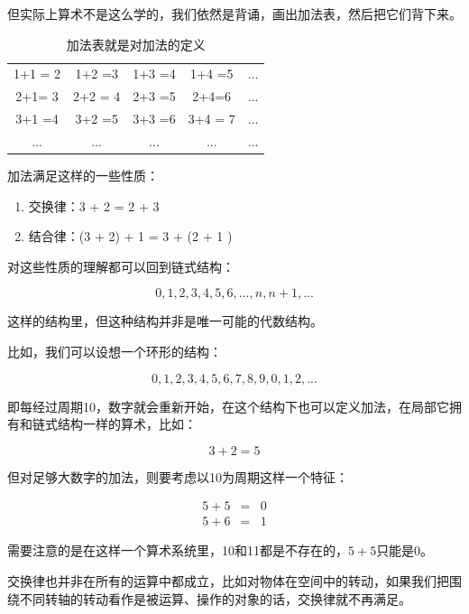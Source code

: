 \begin{enumerate}
但实际上算术不是这么学的，我们依然是背诵，画出加法表，然后把它们背下来。

\begin{table}[htdp]
\caption{加法表就是对加法的定义}
\begin{center}
\begin{tabular}{|c|c|c|c|c|}
\hline
1+1 = 2 & 1+2 =3 & 1+3 =4 & 1+4 =5 & ... \\
2+1= 3 & 2+2 = 4 & 2+3 =5 & 2+4=6 & ...  \\
3+1 =4 & 3+2 =5 & 3+3 =6 & 3+4 = 7 & ... \\
... & ... & ... & ... & ... \\
\hline
\end{tabular}
\end{center}
\end{table}%

加法满足这样的一些性质：

\begin{enumerate}
\item 

交换律：3 + 2 = 2 + 3

\item

结合律：(3 + 2) + 1 = 3 + (2 + 1 )

\end{enumerate}

对这些性质的理解都可以回到链式结构：

\begin{equation*}
0, 1, 2, 3, 4, 5, 6, ..., n, n+1, ...
\end{equation*}

这样的结构里，但这种结构并非是唯一可能的代数结构。

比如，我们可以设想一个环形的结构：

\begin{equation*}
0, 1, 2, 3, 4, 5, 6, 7, 8, 9, 0, 1, 2, ...
\end{equation*}

即每经过周期10，数字就会重新开始，在这个结构下也可以定义加法，在局部它拥有和链式结构一样的算术，比如：

\begin{equation*}
3 + 2 = 5
\end{equation*}

但对足够大数字的加法，则要考虑以10为周期这样一个特征：

\begin{eqnarray*}
5+5 & = & 0\\
5+6 & = & 1 
\end{eqnarray*}

需要注意的是在这样一个算术系统里，10和11都是不存在的，$5+5$只能是0。

交换律也并非在所有的运算中都成立，比如对物体在空间中的转动，如果我们把围绕不同转轴的转动看作是被运算、操作的对象的话，交换律就不再满足。

\end{enumerate}


